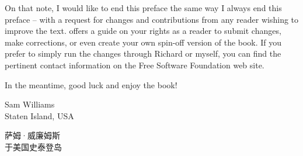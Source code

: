 \ifdefined\chs

\fi

\ifdefined\eng
On that note, I would like to end this preface the same way I always
end this preface -- with a request for changes and contributions from
any reader wishing to improve the text.  offers a
guide on your rights as a reader to submit changes, make corrections,
or even create your own spin-off version of the book. If you prefer to
simply run the changes through Richard or myself, you can find the
pertinent contact information on the Free Software Foundation web site.
\fi

\ifdefined\chs

\fi

\ifdefined\eng
In the meantime, good luck and enjoy the book!
\fi

\ifdefined\chs

\fi

\ifdefined\eng
\vspace{0.5in}
\noindent Sam Williams\\
\noindent Staten Island, USA
\fi

\ifdefined\chs
\vspace{0.5in}
\noindent 萨姆·威廉姆斯\\
\noindent 于美国史泰登岛
\fi
